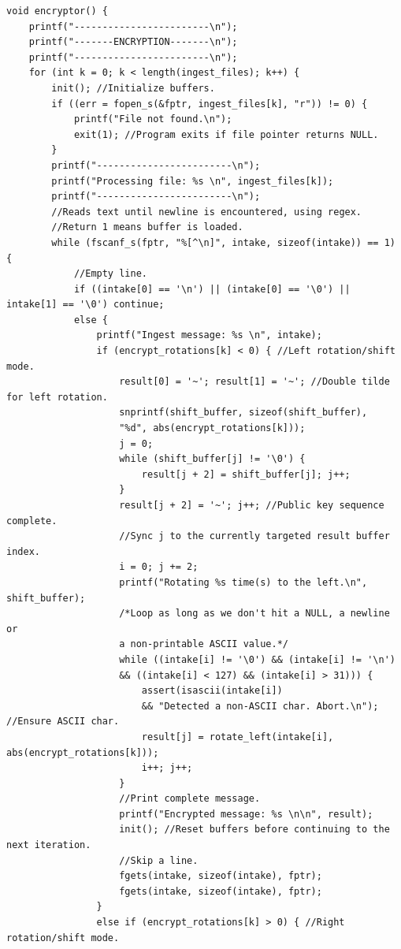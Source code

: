 \documentclass{article}
\begin{document}
\begin{verbatim}
void encryptor() {
    printf("------------------------\n");
    printf("-------ENCRYPTION-------\n");
    printf("------------------------\n");
    for (int k = 0; k < length(ingest_files); k++) {
        init(); //Initialize buffers.
        if ((err = fopen_s(&fptr, ingest_files[k], "r")) != 0) {
            printf("File not found.\n");
            exit(1); //Program exits if file pointer returns NULL.
        }
        printf("------------------------\n");
        printf("Processing file: %s \n", ingest_files[k]);
        printf("------------------------\n");
        //Reads text until newline is encountered, using regex.
        //Return 1 means buffer is loaded.
        while (fscanf_s(fptr, "%[^\n]", intake, sizeof(intake)) == 1) { 
            //Empty line.
            if ((intake[0] == '\n') || (intake[0] == '\0') || intake[1] == '\0') continue;
            else {
                printf("Ingest message: %s \n", intake);
                if (encrypt_rotations[k] < 0) { //Left rotation/shift mode.
                    result[0] = '~'; result[1] = '~'; //Double tilde for left rotation.
                    snprintf(shift_buffer, sizeof(shift_buffer),
                    "%d", abs(encrypt_rotations[k]));
                    j = 0;
                    while (shift_buffer[j] != '\0') {
                        result[j + 2] = shift_buffer[j]; j++;
                    }
                    result[j + 2] = '~'; j++; //Public key sequence complete.
                    //Sync j to the currently targeted result buffer index.
                    i = 0; j += 2;
                    printf("Rotating %s time(s) to the left.\n", shift_buffer);
                    /*Loop as long as we don't hit a NULL, a newline or
                    a non-printable ASCII value.*/
                    while ((intake[i] != '\0') && (intake[i] != '\n')
                    && ((intake[i] < 127) && (intake[i] > 31))) {
                        assert(isascii(intake[i])
                        && "Detected a non-ASCII char. Abort.\n"); //Ensure ASCII char.
                        result[j] = rotate_left(intake[i], abs(encrypt_rotations[k]));
                        i++; j++;
                    }
                    //Print complete message.
                    printf("Encrypted message: %s \n\n", result);
                    init(); //Reset buffers before continuing to the next iteration.
                    //Skip a line.
                    fgets(intake, sizeof(intake), fptr);
                    fgets(intake, sizeof(intake), fptr);
                }
                else if (encrypt_rotations[k] > 0) { //Right rotation/shift mode.

\end{verbatim}
\end{document}
